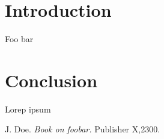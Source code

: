 \documentclass{ctuthesis}
\begin{document}
	
\maketitle

\chapter{Introduction}

Foo bar

\chapter{Conclusion}

Lorep ipsum \cite{doe}

\begin{thebibliography}{1}
	
 J. Doe. \emph{Book on foobar.} Publisher X,2300.

\end{thebibliography}
\end{document}
